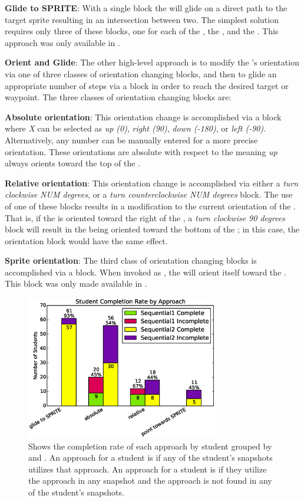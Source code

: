 \textbf{Glide to SPRITE}: With a single \glideto{} block the \net{} will glide
on a direct path to the target sprite resulting in an intersection between
two. The simplest \com{} solution requires only three of these blocks, one for
each of the \bear{}, the \horse{}, and the \zebra{}. This approach was only
available in \stwo{}.

\textbf{Orient and Glide}: The other high-level approach is to modify the
\net{}'s orientation via one of three classes of orientation changing blocks,
and then to glide an appropriate number of steps via a \glideDIST{} block in
order to reach the desired target or waypoint. The three classes of orientation
changing blocks are:

\textbf{Absolute orientation}: This orientation change is accomplished via a
\pointDIR{} block where \emph{X} can be selected as \emph{up (0)}, \emph{right
  (90)}, \emph{down (-180)}, or \emph{left (-90)}. Alternatively, any number
can be manually entered for a more precise orientation. These orientations are
absolute with respect to the \stage{} meaning \emph{up} always orients toward
the top of the \stage{}.

\textbf{Relative orientation}: This orientation change is accomplished via
either a \emph{turn clockwise NUM degrees}, or a \emph{turn counterclockwise
  NUM degrees} block. The use of one of these blocks results in a modification
to the current orientation of the \net{}. That is, if the \net{} is oriented
toward the right of the \stage{}, a \emph{turn clockwise 90 degrees} block will
result in the \net{} being oriented toward the bottom of the \stage{}; in this
case, the \abs{} orientation block \pointDIR[down]{} would have the same
effect.

\textbf{Sprite orientation}: The third class of orientation changing blocks is
accomplished via a \pointtoward{} block. When invoked as
\pointtoward[\zebra{}]{}, the \net{} will orient itself toward the
\zebra{}. This block was only made available in \stwo{}.

\begin{figure}[!t]
\centering
\includegraphics[width=3.3in]{graphs/approach_student_success.eps}
\caption{Shows the completion rate of each approach by student grouped by
  \sone{} and \stwo{}. An approach for a student is \com{} if any of the
  student's \com{} snapshots utilizes that approach. An approach for a student
  is \incom{} if they utilize the approach in any \incom{} snapshot and the
  approach is not found in any of the student's \com{} snapshots.}
\end{figure}


